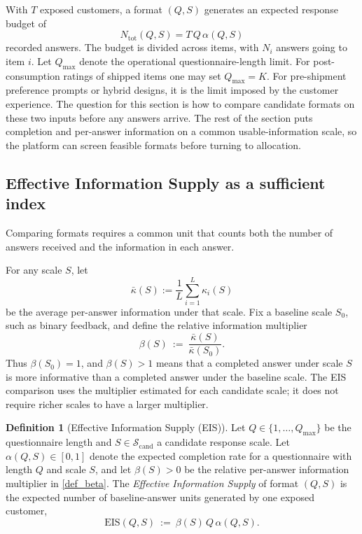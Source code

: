 \documentclass[11pt]{article}
\theoremstyle{definition}
\newtheorem{definition}{Definition}
\theoremstyle{remark}
\newcommand{\1}{\mathbf{1}}
\begin{document}
With \(T\) exposed customers, a format \((Q,S)\) generates an expected
response budget of
\[
N_{\mathrm{tot}}(Q,S)=T\,Q\,\alpha(Q,S)
\]
recorded answers. The budget is divided across items, with \(N_i\)
answers going to item \(i\). Let \(Q_{\max}\) denote the operational
questionnaire-length limit. For post-consumption ratings of shipped
items one may set \(Q_{\max}=K\). For pre-shipment preference prompts
or hybrid designs, it is the limit imposed by the customer experience.
The question for this section is how to compare
candidate formats on these two inputs before any answers arrive. The
rest of the section puts completion and per-answer information on a
common usable-information scale, so the platform can screen feasible
formats before turning to allocation.

\subsection{Effective Information Supply as a sufficient index}
\label{subsec:eis}

Comparing formats requires a common unit that counts both the number of
answers received and the information in each answer.

For any scale \(S\), let
\[
\bar{\kappa}(S):=\frac{1}{L}\sum_{i=1}^L \kappa_i(S)
\]
be the average per-answer information under that scale. Fix a baseline
scale \(S_0\), such as binary feedback, and define the relative
information multiplier
\begin{equation}\label{def_beta}
\beta(S)\ :=\ \frac{\bar{\kappa}(S)}{\bar{\kappa}(S_0)}.
\end{equation}
Thus \(\beta(S_0)=1\), and \(\beta(S)>1\) means that a completed answer
under scale \(S\) is more informative than a completed answer under the
baseline scale. The EIS comparison uses the multiplier estimated for
each candidate scale; it does not require richer scales to have a larger
multiplier.

\begin{definition}[Effective Information Supply (EIS)]
\label{def:eis}
Let $Q\in\{1,\ldots,Q_{\max}\}$ be the questionnaire length and
$S\in\mathcal S_{\mathrm{cand}}$ a candidate response scale. Let
$\alpha(Q,S)\in[0,1]$ denote the expected completion rate for a
questionnaire with length $Q$ and scale $S$, and let $\beta(S)>0$ be
the relative per-answer information multiplier in \eqref{def_beta}. The
\emph{Effective Information Supply} of format $(Q,S)$ is the expected
number of baseline-answer units generated by one exposed customer,
\[
\mathrm{EIS}(Q,S)\ :=\ \beta(S)\,Q\,\alpha(Q,S).
\]
\end{definition}
\end{document}
